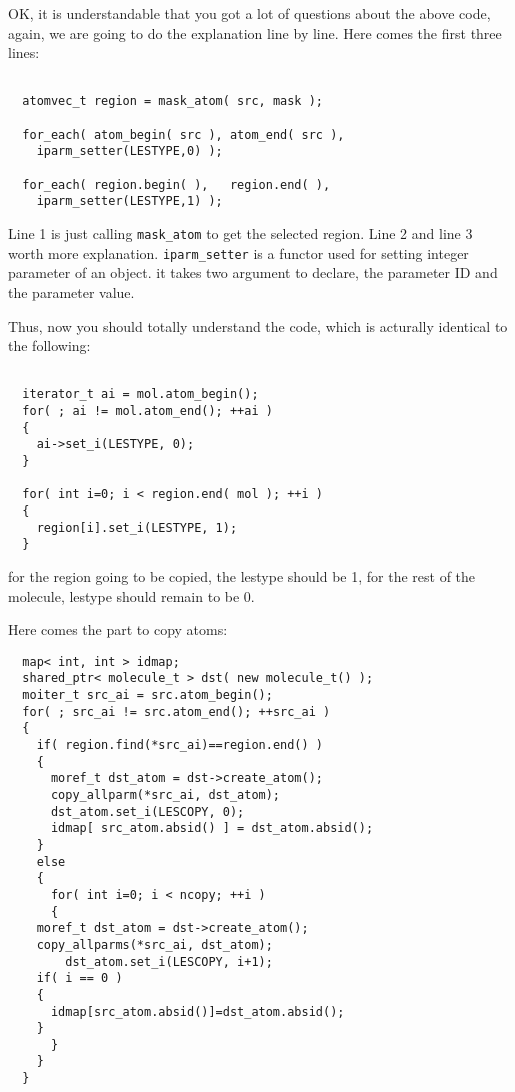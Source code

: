 \documentclass[letterpaper]{book}
\begin{document}
OK, it is understandable that you got a lot of questions about the above code, again, we are 
going to do the explanation line by line. Here comes the first three lines:

\begin{lstlisting}

  atomvec_t region = mask_atom( src, mask );

  for_each( atom_begin( src ), atom_end( src ), 
    iparm_setter(LESTYPE,0) );

  for_each( region.begin( ),   region.end( ),   
    iparm_setter(LESTYPE,1) );

\end{lstlisting}

Line 1 is just calling \lstinline$mask_atom$ to get the selected region. Line 2 and line 3 worth more 
explanation. 
 \lstinline$iparm_setter$ is a functor used for setting integer parameter of an object.
it takes two argument to declare, the parameter ID and the parameter value.


Thus, now you should totally understand the code, which is acturally identical to the following:

\begin{lstlisting}

  iterator_t ai = mol.atom_begin();
  for( ; ai != mol.atom_end(); ++ai )
  {
    ai->set_i(LESTYPE, 0);
  }

  for( int i=0; i < region.end( mol ); ++i )
  {
    region[i].set_i(LESTYPE, 1);
  }

\end{lstlisting}

for the region going to be copied, the lestype should be 1, for the rest of the molecule,
lestype should remain to be 0. 


Here comes the part to copy atoms:

\begin{lstlisting}
  map< int, int > idmap;
  shared_ptr< molecule_t > dst( new molecule_t() );
  moiter_t src_ai = src.atom_begin();
  for( ; src_ai != src.atom_end(); ++src_ai )
  {
    if( region.find(*src_ai)==region.end() )
    {
      moref_t dst_atom = dst->create_atom();
      copy_allparm(*src_ai, dst_atom);
      dst_atom.set_i(LESCOPY, 0);
      idmap[ src_atom.absid() ] = dst_atom.absid();
    }
    else
    {
      for( int i=0; i < ncopy; ++i )
      {
	moref_t dst_atom = dst->create_atom();
	copy_allparms(*src_ai, dst_atom);
        dst_atom.set_i(LESCOPY, i+1);
	if( i == 0 ) 
	{
	  idmap[src_atom.absid()]=dst_atom.absid();
	}
      }
    }
  }
\end{lstlisting}
\end{document}

